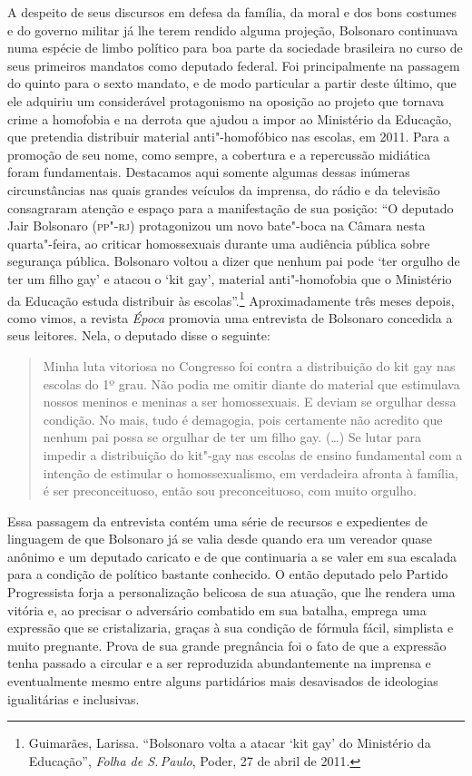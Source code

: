 A despeito de seus discursos em defesa da família, da moral e dos bons
costumes e do governo militar já lhe terem rendido alguma projeção,
Bolsonaro continuava numa espécie de limbo político para boa parte da
sociedade brasileira no curso de seus primeiros mandatos como deputado
federal. Foi principalmente na passagem do quinto para o sexto mandato,
e de modo particular a partir deste último, que ele adquiriu um
considerável protagonismo na oposição ao projeto que tornava crime a
homofobia e na derrota que ajudou a impor ao Ministério da Educação, que
pretendia distribuir material anti"-homofóbico nas escolas, em 2011. Para
a promoção de seu nome, como sempre, a cobertura e a repercussão
midiática foram fundamentais. Destacamos aqui somente algumas dessas
inúmeras circunstâncias nas quais grandes veículos da imprensa, do rádio
e da televisão consagraram atenção e espaço para a manifestação de sua
posição: ``O deputado Jair Bolsonaro (\textsc{pp"-rj}) protagonizou um novo
bate"-boca na Câmara nesta quarta"-feira, ao criticar homossexuais durante
uma audiência pública sobre segurança pública. Bolsonaro voltou a dizer
que nenhum pai pode `ter orgulho de ter um filho gay' e atacou o `kit
gay', material anti"-homofobia que o Ministério da Educação estuda
distribuir às escolas''.\footnote{Guimarães, Larissa. ``Bolsonaro volta a
  atacar `kit gay' do Ministério da Educação'', \emph{Folha de S.\,Paulo},
  Poder, 27 de abril de 2011.}
Aproximadamente três meses depois, como vimos, a revista \emph{Época}
promovia uma entrevista de Bolsonaro concedida a seus leitores. Nela, o
deputado disse o seguinte:

\begin{quote}
Minha luta vitoriosa no Congresso foi contra a distribuição do kit gay
nas escolas do 1º grau. Não podia me omitir diante do material que
estimulava nossos meninos e meninas a ser homossexuais. E deviam se
orgulhar dessa condição. No mais, tudo é demagogia, pois certamente não
acredito que nenhum pai possa se orgulhar de ter um filho gay. (\ldots{}) Se
lutar para impedir a distribuição do kit"-gay nas escolas de ensino
fundamental com a intenção de estimular o homossexualismo, em verdadeira
afronta à família, é ser preconceituoso, então sou preconceituoso, com
muito orgulho.
\end{quote}

Essa passagem da entrevista contém uma série de recursos e expedientes
de linguagem de que Bolsonaro já se valia desde quando era um vereador
quase anônimo e um deputado caricato e de que continuaria a se valer em
sua escalada para a condição de político bastante conhecido. O então
deputado pelo Partido Progressista forja a personalização belicosa de
sua atuação, que lhe rendera uma vitória e, ao precisar o adversário
combatido em sua batalha, emprega uma expressão que se cristalizaria,
graças à sua condição de fórmula fácil, simplista e muito pregnante.
Prova de sua grande pregnância foi o fato de que a expressão tenha
passado a circular e a ser reproduzida abundantemente na imprensa e
eventualmente mesmo entre alguns partidários mais desavisados de
ideologias igualitárias e inclusivas.

